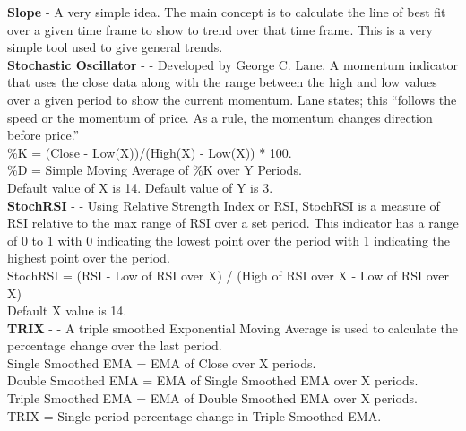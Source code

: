\documentclass[conference]{IEEEtran}
\begin{document}

\noindent
\textbf{Slope} - A very simple idea. The main concept is to calculate the line of best fit over a given time frame to show to trend over that time frame. This is a very simple tool used to give general trends.\\

\noindent
\textbf{Stochastic Oscillator} - \cite{Murphy1999} - Developed by George C. Lane. A momentum indicator that uses the close data along with the range between the high and low values over a given period to show the current momentum. Lane states; this ``follows the speed or the momentum of price. As a rule, the momentum changes direction before price.'' \\

\noindent
\%K = (Close - Low(X))/(High(X) - Low(X)) * 100.\\
\%D = Simple Moving Average of \%K over Y Periods. \\
Default value of X is 14. Default value of Y is 3.\\

\noindent
\textbf{StochRSI} - \cite{Chande1994} - Using Relative Strength Index or RSI, StochRSI is a measure of RSI relative to the max range of RSI over a set period. This indicator has a range of 0 to 1 with 0 indicating the lowest point over the period with 1 indicating the highest point over the period.\\

\noindent
StochRSI = (RSI - Low of RSI over X) / (High of RSI over X - Low of RSI over X)\\
Default X value is 14.\\

\noindent
\textbf{TRIX} - \cite{Hutson1983} - A triple smoothed Exponential Moving Average is used to calculate the percentage change over the last period.\\

\noindent
Single Smoothed EMA = EMA of Close over X periods.\\
Double Smoothed EMA = EMA of Single Smoothed EMA over X periods.\\
Triple Smoothed EMA = EMA of Double Smoothed EMA over X periods.\\
TRIX = Single period percentage change in Triple Smoothed EMA. \\
\end{document}
